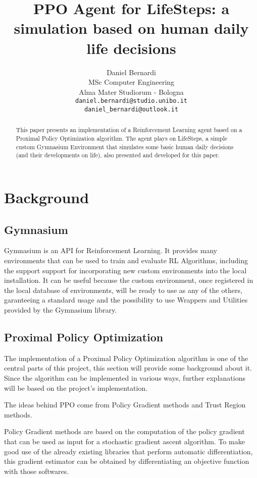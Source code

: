\documentclass{article}
\title{PPO Agent for LifeSteps: a simulation based on human daily life decisions}
\author{%
  Daniel Bernardi\\
  MSc Computer Engineering\\
  Alma Mater Studiorum - Bologna\\
  \texttt{daniel.bernardi@studio.unibo.it} \\
  \texttt{daniel\_bernardi@outlook.it}
}
\begin{document}
\maketitle

\begin{abstract}
  This paper presents an implementation of a Reinforcement Learning agent based on a Proximal Policy Optimization algorithm. The agent plays on LifeSteps, a simple custom Gymnasium Environment that simulates some basic human daily decisions (and their developments on life), also presented and developed for this paper.
\end{abstract}

\section{Background}

\subsection{Gymnasium}
Gymnasium is an API for Reinforcement Learning. It provides many environments that can be used to train and evaluate RL Algorithms, including the support support for incorporating new custom environments into the local installation. It can be useful because the custom environment, once registered in the local database of environments, will be ready to use as any of the others, garanteeing a standard usage and the possibility to use Wrappers and Utilities provided by the Gymnasium library.

\subsection{Proximal Policy Optimization}
The implementation of a Proximal Policy Optimization algorithm is one of the central parts of this project, this section will provide some background about it. Since the algorithm can be implemented in various ways, further explanations will be based on the project's implementation.

The ideas behind PPO come from Policy Gradient methods and Trust Region methods.

Policy Gradient methods are based on the computation of the policy gradient that can be used as input for a stochastic gradient ascent algorithm. To make good use of the already existing libraries that perform automatic differentiation, this gradient estimator can be obtained by differentiating an objective function with those softwares.
\end{document}
